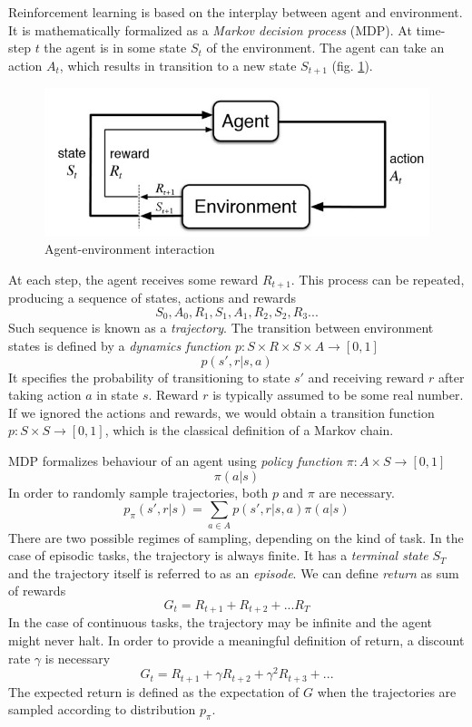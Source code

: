 \documentclass[12pt]{article}
\begin{document}
Reinforcement learning \cite{rl_sutton} is based on the interplay between agent and environment. 
It is mathematically formalized as a \textit{Markov decision process} (MDP).
At time-step $t$ the agent is in some state $S_t$ of the environment. The agent can take an action $A_t$, which results in transition to a new state  $S_{t+1}$ (fig. \ref{fig:agent_env_interaction}). 
\begin{figure}[!htbp]
	\centering
	\includegraphics[width=13cm]{supervised reinforcement learning}
	\caption{Agent-environment interaction}
	\label{fig:agent_env_interaction}
\end{figure}
At each step, the agent receives some reward $R_{t+1}$. This process can be repeated, producing a sequence of states, actions and rewards
\[
S_0, A_0, R_1, S_1, A_1, R_2, S_2, R_3 ...
\]
Such sequence is known as a \textit{trajectory}. The transition between environment states is defined by a \textit{dynamics function} $p:S\times R\times S \times A \rightarrow [0,1]$
\[
p(s',r | s, a)
\]
It specifies the probability of transitioning to state $s'$ and receiving reward $r$ after taking action $a$ in state $s$. Reward $r$ is typically assumed to be some real number. If we ignored the actions and rewards, we would obtain a transition function  $p:S\times S \rightarrow [0,1]$, which is the classical definition of a  Markov chain. 

MDP formalizes behaviour of an agent using \textit{policy function} $\pi:A\times S\rightarrow[0,1]$
\[
\pi(a|s)
\]
In order to randomly sample trajectories, both $p$ and $\pi$ are necessary. 
\[
p_{\pi}(s',r|s) = \sum_{a\in A}p(s',r|s,a)\pi(a|s)
\]
There are two possible regimes of sampling, depending on the kind of task. 
In the case of episodic tasks, the trajectory is always finite. It has a  \textit{terminal state} $S_T$ and the trajectory itself is referred to as an \textit{episode}. We can define \textit{return} as sum of rewards
\[
G_t = R_{t+1}+R_{t+2}+...R_T
\]
In the case of continuous tasks, the trajectory may be infinite and the agent might never halt. In order to provide a meaningful definition of return, a discount rate $\gamma$ is necessary 
\[
G_t = R_{t+1}+\gamma R_{t+2}+\gamma^2 R_{t+3}+...
\]
The expected return is defined as the expectation of $G$ when the trajectories are sampled according to distribution $p_\pi$.
\end{document}
